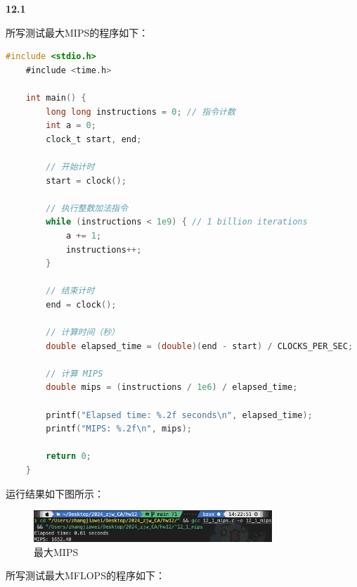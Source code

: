 \documentclass[UTF8]{report}
\begin{document}
\pagestyle{fancy}

\maketitle

\noindent
\textbf{12.1}

所写测试最大MIPS的程序如下：

\begin{lstlisting}[language=C]
    #include <stdio.h>
    #include <time.h>
    
    int main() {
        long long instructions = 0; // 指令计数
        int a = 0;
        clock_t start, end;
    
        // 开始计时
        start = clock();
    
        // 执行整数加法指令
        while (instructions < 1e9) { // 1 billion iterations
            a += 1;
            instructions++;
        }
    
        // 结束计时
        end = clock();
    
        // 计算时间（秒）
        double elapsed_time = (double)(end - start) / CLOCKS_PER_SEC;
    
        // 计算 MIPS
        double mips = (instructions / 1e6) / elapsed_time;
    
        printf("Elapsed time: %.2f seconds\n", elapsed_time);
        printf("MIPS: %.2f\n", mips);
    
        return 0;
    }
\end{lstlisting}

运行结果如下图所示：

\begin{figure}[H]
    \centering
    \includegraphics[width=0.8\textwidth]{img/maxMIPS.png}
    \caption{最大MIPS}
\end{figure}

所写测试最大MFLOPS的程序如下：
\end{document}
